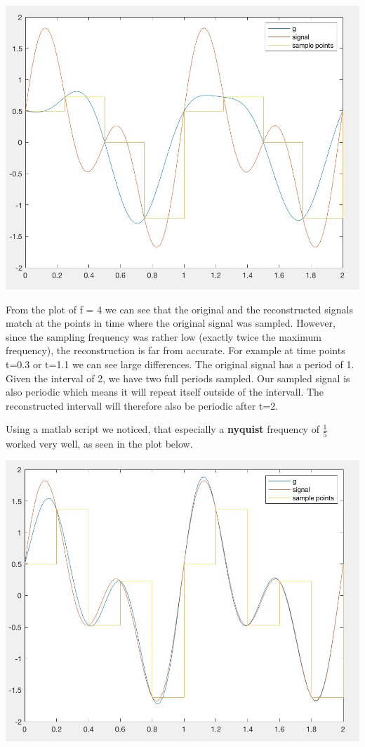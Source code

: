 \documentclass[12pt]{article}
\begin{document}
\begin{enumerate}[a)]
\begin{centering}
\includegraphics[scale = 0.3]{figures/sinc4}\\
\end{centering}

From the plot of f = 4 we can see that the original and the reconstructed signals match at the points in time where the original signal was sampled. However, since the sampling frequency was rather low (exactly twice the maximum frequency), the reconstruction is far from accurate. For example at time points t=0.3 or t=1.1 we can see large differences. The original signal has a period of 1. Given the interval of 2, we have two full  periods sampled. Our sampled signal is also periodic which means it will repeat itself outside of the intervall. The reconstructed intervall will therefore also be periodic after t=2.

Using a matlab script we noticed, that especially a \textbf{nyquist} frequency of $\frac{1}{5}$ worked very well, as seen in the plot below.\\

\begin{centering}
\includegraphics[scale = 0.3]{figures/sinc5}\\
\end{centering}



\end{enumerate}
\end{document}
